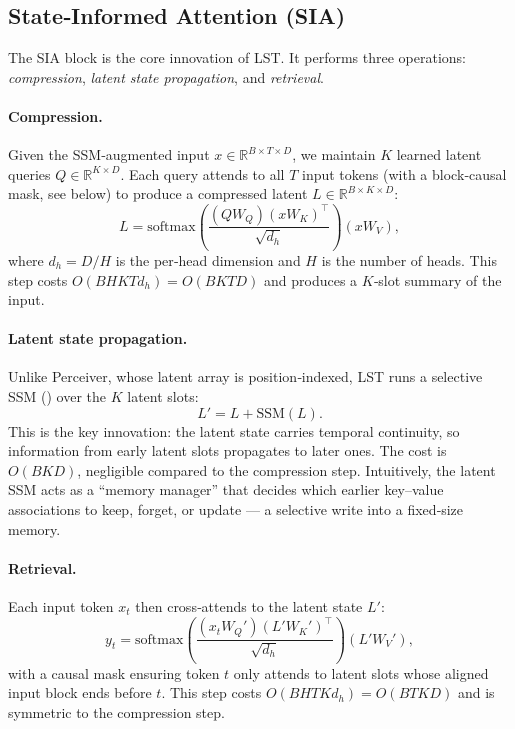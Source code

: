 \documentclass[10pt,twocolumn,letterpaper]{article}
\newcommand{\LST}{\textsc{LST}}
\newcommand{\SIA}{\textsc{SIA}}
\begin{document}
\subsection{State‑Informed Attention (\SIA{})}
\label{sec:sia}

The \SIA{} block is the core innovation of \LST{}.  It performs three operations: \emph{compression}, \emph{latent state propagation}, and \emph{retrieval}.

\paragraph{Compression.}  Given the SSM‑augmented input $x\in\mathbb{R}^{B\times T\times D}$, we maintain $K$ learned latent queries $Q\in\mathbb{R}^{K\times D}$.  Each query attends to all $T$ input tokens (with a block‑causal mask, see below) to produce a compressed latent $L\in\mathbb{R}^{B\times K\times D}$:
\begin{equation}
    L = \mathrm{softmax}\!\left(\frac{(Q W_Q)(x W_K)^{\top}}{\sqrt{d_h}}\right) (x W_V),
    \label{eq:compress}
\end{equation}
where $d_h = D/H$ is the per‑head dimension and $H$ is the number of heads.  This step costs $O(B H K T d_h) = O(B K T D)$ and produces a $K$‑slot summary of the input.

\paragraph{Latent state propagation.}  Unlike Perceiver, whose latent array is position‑indexed, \LST{} runs a selective SSM () over the $K$ latent slots:
\begin{equation}
    L' = L + \mathrm{SSM}(L).
    \label{eq:latent_ssm}
\end{equation}
This is the key innovation: the latent state carries temporal continuity, so information from early latent slots propagates to later ones.  The cost is $O(B K D)$, negligible compared to the compression step.  Intuitively, the latent SSM acts as a ``memory manager'' that decides which earlier key–value associations to keep, forget, or update — a selective write into a fixed‑size memory.

\paragraph{Retrieval.}  Each input token $x_t$ then cross‑attends to the latent state $L'$:
\begin{equation}
    y_t = \mathrm{softmax}\!\left(\frac{(x_t W_Q')(L' W_K')^{\top}}{\sqrt{d_h}}\right) (L' W_V'),
    \label{eq:retrieve}
\end{equation}
with a causal mask ensuring token $t$ only attends to latent slots whose aligned input block ends before $t$.  This step costs $O(B H T K d_h) = O(B T K D)$ and is symmetric to the compression step.
\end{document}
